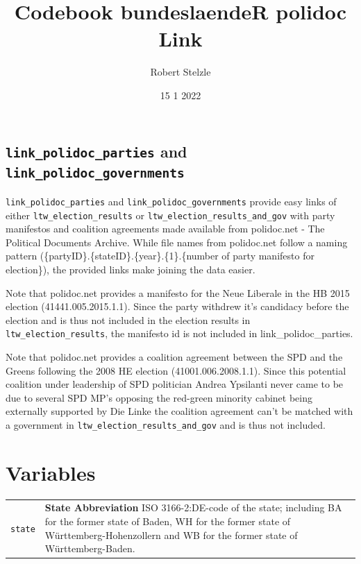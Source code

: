 \documentclass[
]{article}
\title{Codebook bundeslaendeR polidoc Link}
\author{Robert Stelzle}
\date{15 1 2022}
\begin{document}
\maketitle

\hypertarget{link_polidoc_parties-and-link_polidoc_governments}{%
\subsection{\texorpdfstring{\texttt{link\_polidoc\_parties} and
\texttt{link\_polidoc\_governments}}{link\_polidoc\_parties and link\_polidoc\_governments}}\label{link_polidoc_parties-and-link_polidoc_governments}}

\texttt{link\_polidoc\_parties} and \texttt{link\_polidoc\_governments}
provide easy links of either \texttt{ltw\_election\_results} or
\texttt{ltw\_election\_results\_and\_gov} with party manifestos and
coalition agreements made available from polidoc.net - The Political
Documents Archive. While file names from polidoc.net follow a naming
pattern (\{partyID\}.\{stateID\}.\{year\}.\{1\}.\{number of party
manifesto for election\}), the provided links make joining the data
easier.

Note that polidoc.net provides a manifesto for the Neue Liberale in the
HB 2015 election (41441.005.2015.1.1). Since the party withdrew it's
candidacy before the election and is thus not included in the election
results in \texttt{ltw\_election\_results}, the manifesto id is not
included in link\_polidoc\_parties.

Note that polidoc.net provides a coalition agreement between the SPD and
the Greens following the 2008 HE election (41001.006.2008.1.1). Since
this potential coalition under leadership of SPD politician Andrea
Ypsilanti never came to be due to several SPD MP's opposing the
red-green minority cabinet being externally supported by Die Linke the
coalition agreement can't be matched with a government in
\texttt{ltw\_election\_results\_and\_gov} and is thus not included.

\newpage

\hypertarget{variables}{%
\section{Variables}\label{variables}}

\begin{longtable}{p{3.2cm}| p{11cm}}
\texttt{state} &\textbf{State Abbreviation}\newline 
ISO 3166-2:DE-code of the state;
           including BA for the former state of Baden, WH for the former state
           of Württemberg-Hohenzollern and WB for the former state of
           Württemberg-Baden.
\end{longtable}
\end{document}
